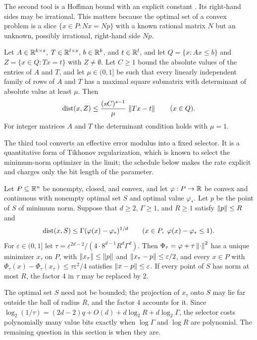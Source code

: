 The second tool is a Hoffman bound with an explicit constant
\citep{Hoffman1952}. Its right-hand sides may be irrational. This matters
because the optimal set of a convex problem is a slice
$\{x\in P:Nx=Np\}$ with a known rational matrix $N$ but an unknown, possibly
irrational, right-hand side $Np$.

\begin{lemma}\label{lem:integer-hoffman}
Let $A\in\mathbb R^{k\times s}$, $T\in\mathbb R^{l\times s}$, $b\in\mathbb R^k$, and $t\in\mathbb R^l$,
and let $Q=\{x:Ax\le b\}$ and $Z=\{x\in Q:Tx=t\}$ with $Z\ne\emptyset$. Let
$C\ge1$ bound the absolute values of the entries of $A$ and $T$, and let
$\mu\in(0,1]$ be such that every linearly independent family of rows of $A$
and $T$ has a maximal square submatrix with determinant of absolute value
at least $\mu$. Then
\[
 \operatorname{dist}(x,Z)\le\frac{(sC)^{s-1}}{\mu}\,\left\lVert Tx-t\right\rVert\qquad(x\in Q).
\]
For integer matrices $A$ and $T$ the determinant condition holds with
$\mu=1$.
\end{lemma}

The third tool converts an effective error modulus into a fixed selector.
It is a quantitative form of Tikhonov regularization, which is known to
select the minimum-norm optimizer in the limit; the schedule below makes
the rate explicit and charges only the bit length of the parameter.

\begin{lemma}\label{lem:selector}
Let $P\subseteq\mathbb R^n$ be nonempty, closed, and convex, and let
$\varphi:P\to\mathbb R$ be convex and continuous with nonempty optimal set $S$ and
optimal value $\varphi_*$. Let $p$ be the point of $S$ of minimum norm.
Suppose that $d\ge2$, $\Gamma\ge1$, and $R\ge1$ satisfy $\left\lVert p\right\rVert\le R$ and
\[
 \operatorname{dist}(x,S)\le\Gamma(\varphi(x)-\varphi_*)^{1/d}\qquad
 (x\in P,\ \varphi(x)-\varphi_*\le1).
\]
For $\varepsilon\in(0,1]$ let
$\tau=\varepsilon^{2d-2}/(4\cdot8^{d-1}R^d\Gamma^d)$. Then
$\Phi_\tau=\varphi+\tau\left\lVert\cdot\right\rVert^2$ has a unique minimizer $x_\tau$ on
$P$, with $\left\lVert x_\tau\right\rVert\le\left\lVert p\right\rVert$ and $\left\lVert x_\tau-p\right\rVert\le\varepsilon/2$,
and every $x\in P$ with $\Phi_\tau(x)-\Phi_\tau(x_\tau)\le\tau\varepsilon^2/4$
satisfies $\left\lVert x-p\right\rVert\le\varepsilon$. If every point of $S$ has norm at most
$R$, the factor $4$ in $\tau$ may be replaced by $2$.
\end{lemma}

The optimal set $S$ need not be bounded; the projection of $x_\tau$ onto
$S$ may lie far outside the ball of radius $R$, and the factor $4$ accounts
for it. Since $\log_2(1/\tau)=(2d-2)q+O(d)+d\log_2R+d\log_2\Gamma$, the
selector costs polynomially many value bits exactly when $\log\Gamma$ and
$\log R$ are polynomial. The remaining question in this section is when they
are.

